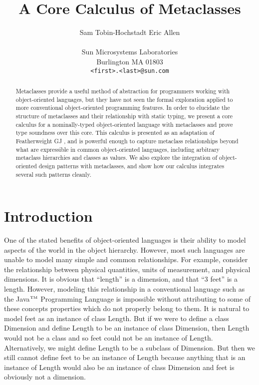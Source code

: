 \documentclass{acmconfbig}
\begin{document}
\title{A Core Calculus of Metaclasses}

\author{Sam Tobin-Hochstadt \quad Eric Allen \\
\begin{tabular}{c}
\\
Sun Microsystems Laboratories \\
Burlington MA 01803 \\
{\tt \large <first>.<last>@sun.com} \\
\end{tabular}
}

\maketitle


\begin{abstract}
Metaclasses provide a useful method of abstraction for programmers
working with object-oriented languages, but they have not seen the
formal exploration applied to more conventional object-oriented
programming features.  In order to elucidate the structure of
metaclasses and their relationship with static typing, we present a
core calculus for a nominally-typed object-oriented language with
metaclasses and prove type soundness over this core.  This calculus is
presented as an adaptation of Featherweight GJ \cite{FJ}, and is
powerful enough to capture metaclass relationships beyond what are
expressible in common object-oriented languages, including arbitrary
metaclass hierarchies and classes as values.  We also explore the
integration of object-oriented design patterns with metaclasses, and
show how our calculus integrates several such patterns cleanly.
\end{abstract}

\section{Introduction}
One of the stated benefits of object-oriented languages is their
ability to model aspects of the world in the object hierarchy.
However, most such languages are unable to model many simple and
common relationships. For example, consider the relationship between
physical quantities, units of measurement, and physical dimensions. It
is obvious that ``length'' is a dimension, and that ``3 feet'' is a
length.  However, modeling this relationship in a conventional
language such as the Java${^{\mbox{\tiny{TM}}}}$ Programming Language
is impossible without attributing to some of these concepts properties
which do not properly belong to them.  It is natural to model {
feet} as an instance of class {\txt Length}. But if we were to define
a class {\txt Dimension} and define {\txt Length} to be an instance of
class {\txt Dimension}, then {\txt Length} would not be a class and so
{ feet} could not be an instance of {\txt
Length}. Alternatively, we might define {\txt Length} to be a subclass
of {\txt Dimension}. But then we still cannot define { feet} to
be an instance of {\txt Length} because anything that is an instance
of {\txt Length} would also be an instance of class {\txt Dimension}
and { feet} is obviously not a dimension.
\end{document}
